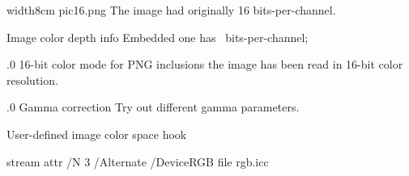 

\pdfximage width8cm {pic16.png}%
\pdfrefximage\pdflastximage
The image had originally 16 bits-per-channel.

 {Image color depth info}
Embedded one has \the\pdflastximagecolordepth\ bits-per-channel;
\endfeature

.0 {16-bit color mode for PNG inclusions}
the image has been read in 16-bit color resolution.
\endfeature

.0 {Gamma correction}
Try out different gamma parameters. %
\endfeature                         %

\bigskip



 {User-defined image color space hook}

\immediate\pdfobj
  stream
  attr {/N 3 /Alternate /DeviceRGB}
  file {rgb.icc} %

\immediate{}

\edef\objnum{\the\pdflastobj}

